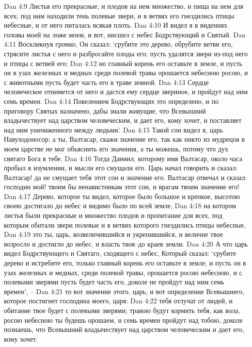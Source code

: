 Dan 4:9  Листья его прекрасные, и плодов на нем множество, и пища на нем для всех; под ним находили тень полевые звери, и в ветвях его гнездились птицы небесные, и от него питалась всякая плоть.
Dan 4:10  И видел я в видениях головы моей на ложе моем, и вот, нисшел с небес Бодрствующий и Святый.
Dan 4:11  Воскликнув громко, Он сказал: `срубите это дерево, обрубите ветви его, стрясите листья с него и разбросайте плоды его; пусть удалятся звери из-под него и птицы с ветвей его;
Dan 4:12  но главный корень его оставьте в земле, и пусть он в узах железных и медных среди полевой травы орошается небесною росою, и с животными пусть будет часть его в траве земной.
Dan 4:13  Сердце человеческое отнимется от него и дастся ему сердце звериное, и пройдут над ним семь времен.
Dan 4:14  Повелением Бодрствующих это определено, и по приговору Святых назначено, дабы знали живущие, что Всевышний владычествует над царством человеческим, и дает его, кому хочет, и поставляет над ним уничиженного между людьми'.
Dan 4:15  Такой сон видел я, царь Навуходоносор; а ты, Валтасар, скажи значение его, так как никто из мудрецов в моем царстве не мог объяснить его значения, а ты можешь, потому что дух святаго Бога в тебе.
Dan 4:16  Тогда Даниил, которому имя Валтасар, около часа пробыл в изумлении, и мысли его смущали его. Царь начал говорить и сказал: Валтасар! да не смущает тебя этот сон и значение его. Валтасар отвечал и сказал: господин мой! твоим бы ненавистникам этот сон, и врагам твоим значение его!
Dan 4:17  Дерево, которое ты видел, которое было большое и крепкое, высотою своею достигало до небес и видимо было по всей земле,
Dan 4:18  на котором листья были прекрасные и множество плодов и пропитание для всех, под которым обитали звери полевые и в ветвях которого гнездились птицы небесные,
Dan 4:19  это ты, царь, возвеличившийся и укрепившийся, и величие твое возросло и достигло до небес, и власть твоя--до краев земли.
Dan 4:20  А что царь видел Бодрствующего и Святаго, сходящего с небес, Который сказал: `срубите дерево и истребите его, только главный корень его оставьте в земле, и пусть он в узах железных и медных, среди полевой травы, орошается росою небесною, и с полевыми зверями пусть будет часть его, доколе не пройдут над ним семь времен', --
Dan 4:21  то вот значение этого, царь, и вот определение Всевышнего, которое постигнет господина моего, царя:
Dan 4:22  тебя отлучат от людей, и обитание твое будет с полевыми зверями; травою будут кормить тебя, как вола, росою небесною ты будешь орошаем, и семь времен пройдут над тобою, доколе познаешь, что Всевышний владычествует над царством человеческим и дает его, кому хочет.
